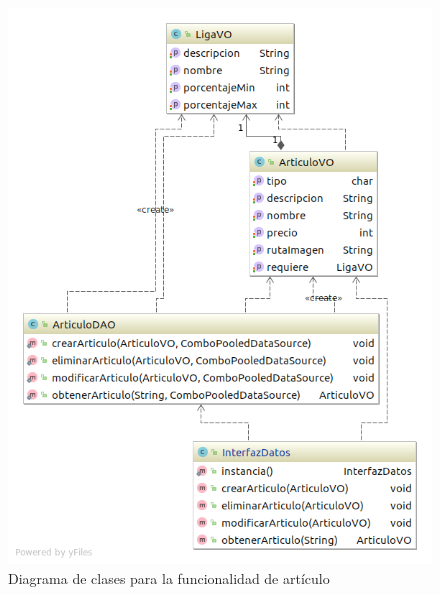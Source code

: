 \begin{figure}[H]
\centering
\includegraphics[scale = 0.5]{figuras/base_datos/clasesArticulo.png}
\caption{Diagrama de clases para la funcionalidad de artículo}
\label{fig:diagramaClasesArticulo}
\end{figure}
